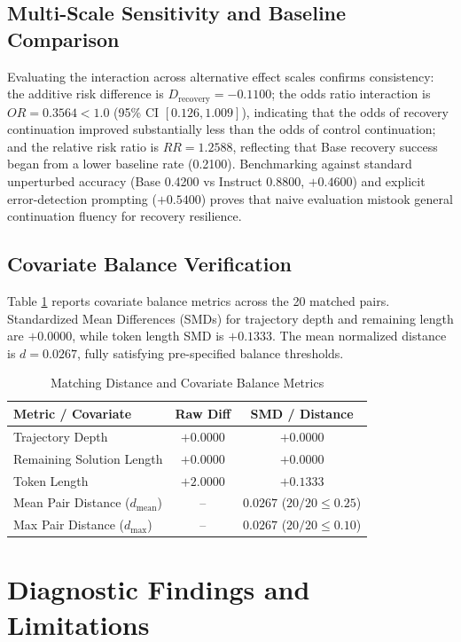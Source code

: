\documentclass[conference]{IEEEtran}
\begin{document}
\subsection{Multi-Scale Sensitivity and Baseline Comparison}
Evaluating the interaction across alternative effect scales confirms consistency: the additive risk difference is $D_{\text{recovery}} = -0.1100$; the odds ratio interaction is $OR = 0.3564 < 1.0$ (95\% CI $[0.126, 1.009]$), indicating that the odds of recovery continuation improved substantially less than the odds of control continuation; and the relative risk ratio is $RR = 1.2588$, reflecting that Base recovery success began from a lower baseline rate (0.2100). Benchmarking against standard unperturbed accuracy (Base 0.4200 vs Instruct 0.8800, $+0.4600$) and explicit error-detection prompting ($+0.5400$) proves that naive evaluation mistook general continuation fluency for recovery resilience.

\subsection{Covariate Balance Verification}
Table \ref{tab:sensitivity} reports covariate balance metrics across the 20 matched pairs. Standardized Mean Differences (SMDs) for trajectory depth and remaining length are $+0.0000$, while token length SMD is $+0.1333$. The mean normalized distance is $d = 0.0267$, fully satisfying pre-specified balance thresholds.

\begin{table}[htbp]
\caption{Matching Distance and Covariate Balance Metrics}
\label{tab:sensitivity}
\centering
\begin{tabularx}{\columnwidth}{Xcc}
\toprule
\textbf{Metric / Covariate} & \textbf{Raw Diff} & \textbf{SMD / Distance} \\
\midrule
Trajectory Depth & $+0.0000$ & $+0.0000$ \\
Remaining Solution Length & $+0.0000$ & $+0.0000$ \\
Token Length & $+2.0000$ & $+0.1333$ \\
\midrule
Mean Pair Distance ($d_{\text{mean}}$) & -- & $0.0267$ ($20/20 \le 0.25$) \\
Max Pair Distance ($d_{\max}$) & -- & $0.0267$ ($20/20 \le 0.10$) \\
\bottomrule
\end{tabularx}
\end{table}

\section{Diagnostic Findings and Limitations}
\end{document}

